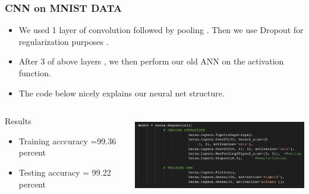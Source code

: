 \documentclass[12pt,t]{beamer}
\begin{document}
\begin{frame}
    \frametitle{CNN on MNIST DATA}
    \scriptsize
    \begin{itemize}
        \item We used 1 layer of convolution followed by pooling . Then we use Dropout for
        regularization purposes .
        \item After 3 of above layers , we then perform our old ANN on the activation function.
        \item The code below nicely explains our neural net structure.
    \end{itemize}

    \begin{columns}
        \begin{column}[T]{0.5\linewidth}
            \begin{block}{Results}
                \begin{itemize}
                    \item Training acccuracy =99.36 percent
                    \item Testing accuracy = 99.22 percent
                \end{itemize}
            \end{block}
        \end{column}

        \begin{column}[T]{0.5\linewidth}
            \includegraphics[width=\linewidth,height=100pt]{convolution_network/layers_mnist.png}
        \end{column}
    \end{columns}

    

\end{frame}
\end{document}

